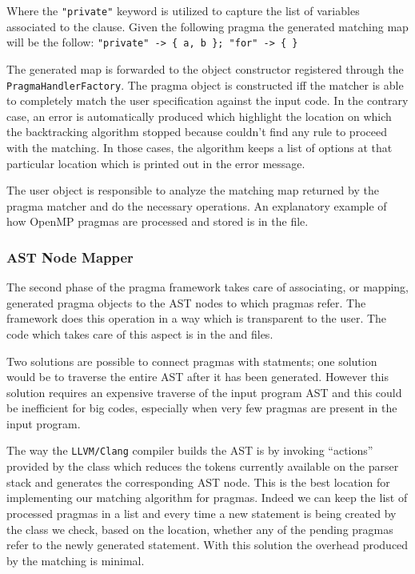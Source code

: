 Where the {\tt "private"} keyword is utilized to capture the list of variables
associated to the clause. Given the following pragma  the generated matching map will be the follow: {\tt "private" -> \{
a, b \}; "for" -> \{ \} }

The generated map is forwarded to the object constructor registered through the
{\tt PragmaHandlerFactory}. The pragma object is constructed iff the matcher is
able to completely match the user specification against the input code. In the
contrary case, an error is automatically produced which highlight the location
on which the backtracking algorithm stopped because couldn't find any rule to
proceed with the matching. In those cases, the algorithm keeps a list of
options at that particular location which is printed out in the error message.

The user object is responsible to analyze the matching map returned by the
pragma matcher and do the necessary operations. An explanatory example of how
OpenMP pragmas are processed and stored is in the
 file. 

\subsubsection{AST Node Mapper}

The second phase of the pragma framework takes care of associating, or mapping,
generated pragma objects to the AST nodes to which pragmas refer. The framework
does this operation in a way which is transparent to the user. The code which
takes care of this aspect is in the  and
 files. 

Two solutions are possible to connect pragmas with statments; one solution would
be to traverse the entire AST after it has been generated.  However this
solution requires an expensive traverse of the input program AST and this could
be inefficient for big codes, especially when very few pragmas are present in
the input program. 

The way the {\tt LLVM/Clang} compiler builds the AST is by invoking ``actions''
provided by the  class which reduces the tokens currently
available on the parser stack and generates the corresponding AST node.
This is the best location for implementing our matching algorithm for pragmas.
Indeed we can keep the list of processed pragmas in a list and every time a new
statement is being created by the  class we check, based on
the location, whether any of the pending pragmas refer to the newly generated
statement. With this solution the overhead produced by the matching is minimal. 

